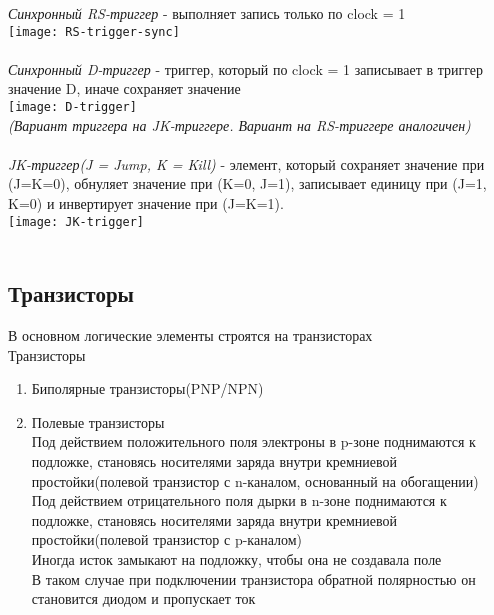 \documentclass[12pt]{article}
\begin{document}
\textit{Синхронный RS-триггер} - выполняет запись только по clock = 1\\
\texttt{[image: RS-trigger-sync]}\\\\
\textit{Синхронный D-триггер} - триггер, который по clock = 1 записывает в триггер значение D, иначе сохраняет значение\\
\texttt{[image: D-trigger]}\\
\textit{(Вариант триггера на JK-триггере. Вариант на RS-триггере аналогичен)}\\\\
\textit{JK-триггер(J = Jump, K = Kill)} - элемент, который сохраняет значение при (J=K=0), обнуляет значение при (K=0, J=1), записывает единицу при (J=1, K=0) и инвертирует значение при (J=K=1).\\
\texttt{[image: JK-trigger]}\\\\
\subsection{Транзисторы}
В основном логические элементы строятся на транзисторах\\
Транзисторы
\begin{enumerate}
    \item Биполярные транзисторы(PNP/NPN)
    \item Полевые транзисторы\\
    Под действием положительного поля электроны в p-зоне поднимаются к подложке, становясь носителями заряда внутри кремниевой простойки(полевой транзистор с n-каналом, основанный на обогащении)\\
    Под действием отрицательного поля дырки в n-зоне поднимаются к подложке, становясь носителями заряда внутри кремниевой простойки(полевой транзистор с p-каналом)\\
    Иногда исток замыкают на подложку, чтобы она не создавала поле\\
    В таком случае при подключении транзистора обратной полярностью он становится диодом и пропускает ток\\
\end{enumerate}
\end{document}

